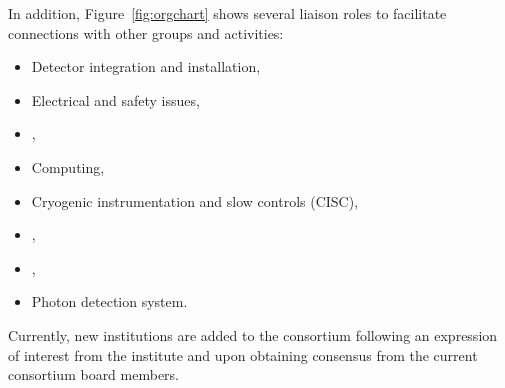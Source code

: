In addition, Figure~\ref{fig:orgchart} shows several liaison roles 
to facilitate connections with other groups and activities:
\begin{itemize}
    \item Detector integration and installation,
    \item Electrical and safety issues,
    \item {},
    \item Computing,
    \item Cryogenic instrumentation and slow controls (CISC),
    \item {},
    \item {},
    \item Photon detection system.
\end{itemize}


Currently, new institutions are added to the consortium following an expression of interest from the institute and upon obtaining consensus from the current consortium board members.

